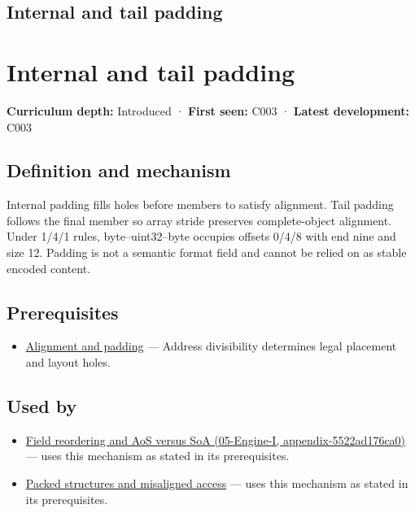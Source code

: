 \hypertarget{appendix-f52f8c5a3afd}{}
\section*{Internal and tail padding}
\chapter{Internal and tail padding}\label{appendix-f52f8c5a3afd-internal-and-tail-padding}

\textbf{Curriculum depth:} Introduced · \textbf{First seen:} C003 · \textbf{Latest development:} C003

\section{Definition and mechanism}\label{appendix-f52f8c5a3afd-definition-and-mechanism}

Internal padding fills holes before members to satisfy alignment. Tail padding follows the final member so array stride preserves complete-object alignment. Under 1/4/1 rules, byte--uint32--byte occupies offsets 0/4/8 with end nine and size 12. Padding is not a semantic format field and cannot be relied on as stable encoded content.

\section{Prerequisites}\label{appendix-f52f8c5a3afd-prerequisites}

\begin{itemize}
\tightlist
\item
  \hyperref[appendix-a1f7c53b4742]{Alignment and padding} --- Address divisibility determines legal placement and layout holes.
\end{itemize}

\section{Used by}\label{appendix-f52f8c5a3afd-used-by}

\begin{itemize}
\tightlist
\item
  \href{../05-Engine-I/main.pdf\#nameddest=appendix-5522ad176ca0}{Field reordering and AoS versus SoA (05-Engine-I, appendix-5522ad176ca0)} --- uses this mechanism as stated in its prerequisites.
\item
  \hyperref[appendix-0682dbfc5f0e]{Packed structures and misaligned access} --- uses this mechanism as stated in its prerequisites.
\end{itemize}

